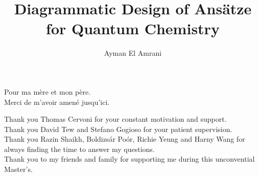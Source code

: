 \documentclass[a4paper,nobind]{ociamthesis}  %
\title{Diagrammatic Design of Ansätze for Quantum Chemistry}
\author{Ayman El Amrani}
\begin{document}
\setlength{\textbaselineskip}{22pt}  %
\setlength{\frontmatterbaselineskip}{17pt plus1pt minus1pt} %
\setlength{\baselineskip}{\textbaselineskip}

\setcounter{secnumdepth}{1}  %
\setcounter{tocdepth}{1}  %


\begin{romanpages}
\maketitle

\begin{dedication}
Pour ma mère et mon père. \\
Merci de m'avoir amené jusqu'ici.
\end{dedication}

\begin{acknowledgements}
Thank you Thomas Cervoni for your constant motivation and support. \\
Thank you David Tew and Stefano Gogioso for your patient supervision. \\
Thank you Razin Shaikh, Boldizsár Poór, Richie Yeung and Harny Wang for always finding the time to answer my questions. \\
Thank you to my friends and family for supporting me during this unconvential Master's.
\end{acknowledgements}

\begin{abstract}
	
\end{abstract}

\flushbottom  %

\tableofcontents

\end{romanpages}














\end{document}
